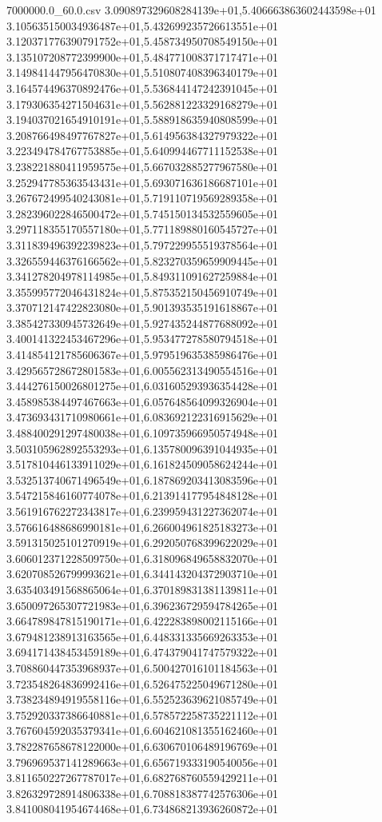 \begin{filecontents*}{7000000.0_60.0.csv}
3.090897329608284139e+01,5.406663863602443598e+01
3.105635150034936487e+01,5.432699235726613551e+01
3.120371776390791752e+01,5.458734950708549150e+01
3.135107208772399900e+01,5.484771008371717471e+01
3.149841447956470830e+01,5.510807408396340179e+01
3.164574496370892476e+01,5.536844147242391045e+01
3.179306354271504631e+01,5.562881223329168279e+01
3.194037021654910191e+01,5.588918635940808599e+01
3.208766498497767827e+01,5.614956384327979322e+01
3.223494784767753885e+01,5.640994467711152538e+01
3.238221880411959575e+01,5.667032885277967580e+01
3.252947785363543431e+01,5.693071636186687101e+01
3.267672499540243081e+01,5.719110719569289358e+01
3.282396022846500472e+01,5.745150134532559605e+01
3.297118355170557180e+01,5.771189880160545727e+01
3.311839496392239823e+01,5.797229955519378564e+01
3.326559446376166562e+01,5.823270359659909445e+01
3.341278204978114985e+01,5.849311091627259884e+01
3.355995772046431824e+01,5.875352150456910749e+01
3.370712147422823080e+01,5.901393535191618867e+01
3.385427330945732649e+01,5.927435244877688092e+01
3.400141322453467296e+01,5.953477278580794518e+01
3.414854121785606367e+01,5.979519635385986476e+01
3.429565728672801583e+01,6.005562313490554516e+01
3.444276150026801275e+01,6.031605293936354428e+01
3.458985384497467663e+01,6.057648564099326904e+01
3.473693431710980661e+01,6.083692122316915629e+01
3.488400291297480038e+01,6.109735966950574948e+01
3.503105962892553293e+01,6.135780096391044935e+01
3.517810446133911029e+01,6.161824509058624244e+01
3.532513740671496549e+01,6.187869203413083596e+01
3.547215846160774078e+01,6.213914177954848128e+01
3.561916762272343817e+01,6.239959431227362074e+01
3.576616488686990181e+01,6.266004961825183273e+01
3.591315025101270919e+01,6.292050768399622029e+01
3.606012371228509750e+01,6.318096849658832070e+01
3.620708526799993621e+01,6.344143204372903710e+01
3.635403491568865064e+01,6.370189831381139811e+01
3.650097265307721983e+01,6.396236729594784265e+01
3.664789847815190171e+01,6.422283898002115166e+01
3.679481238913163565e+01,6.448331335669263353e+01
3.694171438453459189e+01,6.474379041747579322e+01
3.708860447353968937e+01,6.500427016101184563e+01
3.723548264836992416e+01,6.526475225049671280e+01
3.738234894919558116e+01,6.552523639621085749e+01
3.752920337386640881e+01,6.578572258735221112e+01
3.767604592035379341e+01,6.604621081355162460e+01
3.782287658678122000e+01,6.630670106489196769e+01
3.796969537141289663e+01,6.656719333190540056e+01
3.811650227267787017e+01,6.682768760559429211e+01
3.826329728914806338e+01,6.708818387742576306e+01
3.841008041954674468e+01,6.734868213936260872e+01

\end{filecontents*}
